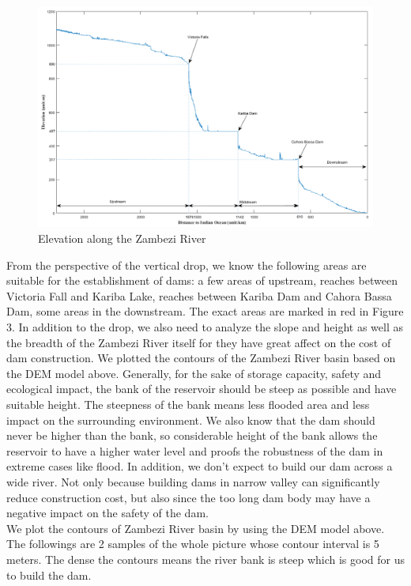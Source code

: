 \documentclass{mcmthesis}
\begin{document}
\begin{figure}[h]
\small
\centering
\includegraphics[width=14cm]{./figures/dis_alti_v3.png}
\caption{Elevation along the Zambezi River} \label{fig:Fig2}
\end{figure}

From the perspective of the vertical drop, we know the following areas are suitable for the establishment of dams: a few areas of upstream, reaches between Victoria Fall and Kariba Lake, reaches between Kariba Dam and Cahora Bassa Dam, some areas in the downstream. The exact areas are marked in red in Figure 3. In addition to the drop, we also need to analyze the slope and height as well as the breadth of the Zambezi River itself for they have great affect on the cost of dam construction. We plotted the contours of the Zambezi River basin based on the DEM model above. Generally, for the sake of storage capacity, safety and ecological impact, the bank of the reservoir should be steep as possible and have suitable height. The steepness of the bank means less flooded area and less impact on the surrounding environment. We also know that the dam should never be higher than the bank, so considerable height of the bank allows the reservoir to have a higher water level and proofs the robustness of the dam in extreme cases like flood. In addition, we don't expect to build our dam across a wide river. Not only because building dams in narrow valley can significantly reduce construction cost, but also since the too long dam body may have a negative impact on the safety of the dam.\\
\indent We plot the contours of Zambezi River basin by using the DEM model above. The followings are 2 samples of the whole picture whose contour interval is 5 meters. The dense the contours means the river bank is steep which is good for us to build the dam.\\
\end{document}
